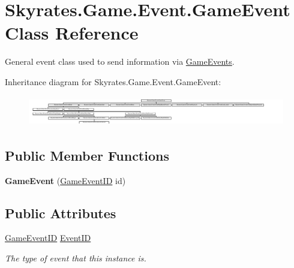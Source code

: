 \hypertarget{class_skyrates_1_1_game_1_1_event_1_1_game_event}{\section{Skyrates.\-Game.\-Event.\-Game\-Event Class Reference}
\label{class_skyrates_1_1_game_1_1_event_1_1_game_event}
}


General event class used to send information via \hyperlink{class_skyrates_1_1_game_1_1_event_1_1_game_events}{Game\-Events}.  


Inheritance diagram for Skyrates.\-Game.\-Event.\-Game\-Event\-:\begin{figure}[H]
\begin{center}
\leavevmode
\includegraphics[height=1.329114cm]{class_skyrates_1_1_game_1_1_event_1_1_game_event}
\end{center}
\end{figure}
\subsection*{Public Member Functions}
\begin{DoxyCompactItemize}
\item 
\hypertarget{class_skyrates_1_1_game_1_1_event_1_1_game_event_af1a5a53e95e22845aa9050aefbf00a95}{{\bfseries Game\-Event} (\hyperlink{namespace_skyrates_1_1_game_1_1_event_ad31565d2f03f234f8f77ebf23ff8f150}{Game\-Event\-I\-D} id)}\label{class_skyrates_1_1_game_1_1_event_1_1_game_event_af1a5a53e95e22845aa9050aefbf00a95}

\end{DoxyCompactItemize}
\subsection*{Public Attributes}
\begin{DoxyCompactItemize}
\item 
\hyperlink{namespace_skyrates_1_1_game_1_1_event_ad31565d2f03f234f8f77ebf23ff8f150}{Game\-Event\-I\-D} \hyperlink{class_skyrates_1_1_game_1_1_event_1_1_game_event_ad403f445789c2415602f1bef7fbc4c4f}{Event\-I\-D}
\begin{DoxyCompactList}\small\item\em The type of event that this instance is. \end{DoxyCompactList}\end{DoxyCompactItemize}



